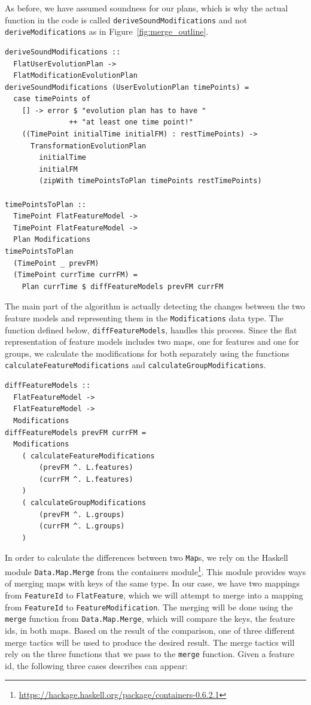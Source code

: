\documentclass[a4paper,english]{ifimaster}
\begin{document}
As before, we have assumed soundness for our plans, which is why the actual function in the code is called \texttt{derive\-Sound\-Modifications} and not \texttt{derive\-Modifications} as in Figure~\ref{fig:merge_outline}.

\begin{verbatim}
deriveSoundModifications :: 
  FlatUserEvolutionPlan -> 
  FlatModificationEvolutionPlan
deriveSoundModifications (UserEvolutionPlan timePoints) = 
  case timePoints of
    [] -> error $ "evolution plan has to have " 
               ++ "at least one time point!"
    ((TimePoint initialTime initialFM) : restTimePoints) ->
      TransformationEvolutionPlan
        initialTime
        initialFM
        (zipWith timePointsToPlan timePoints restTimePoints)

timePointsToPlan ::
  TimePoint FlatFeatureModel -> 
  TimePoint FlatFeatureModel -> 
  Plan Modifications
timePointsToPlan 
  (TimePoint _ prevFM) 
  (TimePoint currTime currFM) =
    Plan currTime $ diffFeatureModels prevFM currFM
\end{verbatim}

The main part of the algorithm is actually detecting the changes between the two feature models and representing them in the \texttt{Modifications} data type. The function defined below, \texttt{diff\-Feature\-Models}, handles this process. Since the flat representation of feature models includes two maps, one for features and one for groups, we calculate the modifications for both separately using the functions \texttt{calculate\-Feature\-Modifications} and \texttt{calculate\-Group\-Modifications}.

\begin{verbatim}
diffFeatureModels :: 
  FlatFeatureModel -> 
  FlatFeatureModel -> 
  Modifications
diffFeatureModels prevFM currFM =
  Modifications
    ( calculateFeatureModifications
        (prevFM ^. L.features)
        (currFM ^. L.features)
    )
    ( calculateGroupModifications
        (prevFM ^. L.groups)
        (currFM ^. L.groups)
    )
\end{verbatim}

In order to calculate the differences between two \texttt{Map}s, we rely on the Haskell module \texttt{Data.Map.Merge} from the containers module\footnote{\url{https://hackage.haskell.org/package/containers-0.6.2.1}}. This module provides ways of merging maps with keys of the same type. In our case, we have two mappings from \texttt{FeatureId} to \texttt{FlatFeature}, which we will attempt to merge into a mapping from \texttt{FeatureId} to \texttt{FeatureModification}. The merging will be done using the \texttt{merge} function from \texttt{Data.Map.Merge}, which will compare the keys, the feature ids, in both maps. Based on the result of the comparison, one of three different merge tactics will be used to produce the desired result. The merge tactics will rely on the three functions that we pass to the \texttt{merge} function. Given a feature id, the following three cases describes can appear:
\end{document}
